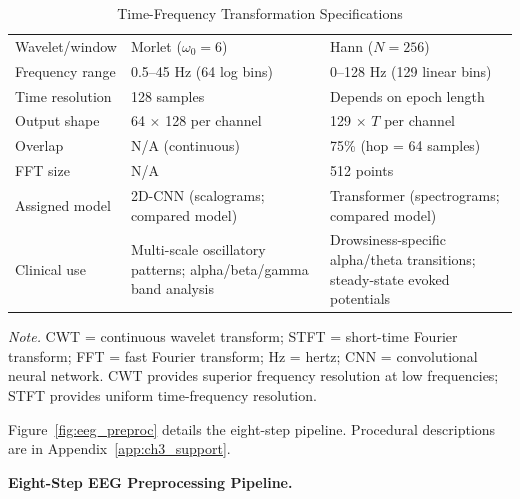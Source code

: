\begin{table}[!htbp]
\tablestripes
\caption{Time-Frequency Transformation Specifications}
\tablefontsize
\begin{tabularx}{\textwidth}{@{} >{\raggedright\arraybackslash}p{2.5cm} L L @{}}
\toprule
{} &  &  \\
\midrule
Wavelet/window & Morlet ($\omega_0 = 6$) & Hann ($N = 256$) \\
\addlinespace
Frequency range & 0.5--45 Hz (64 log bins) & 0--128 Hz (129 linear bins) \\
\addlinespace
Time resolution & 128 samples & Depends on epoch length \\
\addlinespace
Output shape & 64 $\times$ 128 per channel & 129 $\times$ $T$ per channel \\
\addlinespace
Overlap & N/A (continuous) & 75\% (hop = 64 samples) \\
\addlinespace
FFT size & N/A & 512 points \\
\addlinespace
Assigned model & 2D-CNN (scalograms; compared model) & Transformer (spectrograms; compared model) \\
\addlinespace
Clinical use & Multi-scale oscillatory patterns; alpha/beta/gamma band analysis & Drowsiness-specific alpha/theta transitions; steady-state evoked potentials \\
\bottomrule
\end{tabularx}
\vspace{0.5em}
\noindent\textit{Note.} CWT = continuous wavelet transform; STFT = short-time Fourier transform; FFT = fast Fourier transform; Hz = hertz; CNN = convolutional neural network. CWT provides superior frequency resolution at low frequencies; STFT provides uniform time-frequency resolution.
\end{table}

Figure~\ref{fig:eeg_preproc} details the eight-step pipeline. Procedural descriptions are in Appendix~\ref{app:ch3_support}.


\noindent\textbf{Eight-Step EEG Preprocessing Pipeline.}

